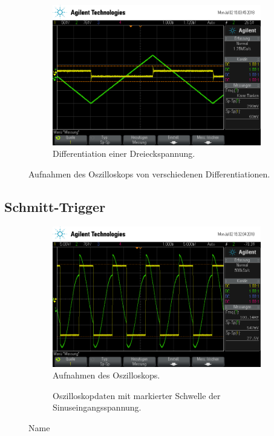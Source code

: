 \begin{figure}[ht]
\begin{subfigure}[]{\textwidth}
    \label{subfig:dif_rechteck}
  \end{subfigure}
  \begin{subfigure}[]{\textwidth}
    \centering
    \includegraphics[height=0.3\textheight]{data/scope_267.png}
    \caption{Differentiation einer Dreieckspannung.}
    \label{subfig:dif_dreieck}
  \end{subfigure}
  \caption{Aufnahmen des Oszilloskops von verschiedenen Differentiationen.}
  \label{fig:integrationen}
\end{figure}

\subsection{Schmitt-Trigger}
\begin{figure}[ht]
  \centering
  \begin{subfigure}{\textwidth}
    \centering
    \includegraphics[height=0.3\textheight]{data/scope_268.png}
    \caption{Aufnahmen des Oszilloskops.}
    \label{fig:schmitt_osz}
  \end{subfigure}
  \begin{subfigure}{\textwidth}
    \centering
    
    \caption{Oszilloskopdaten mit markierter Schwelle der Sinuseingangsspannung.}
    \label{fig:schmitt_plot}
  \end{subfigure}
  \caption{Name}
  \label{fig:schmitt}
\end{figure}

